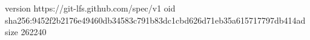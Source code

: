version https://git-lfs.github.com/spec/v1
oid sha256:9452f2b2176e49460db34583c791b83dc1cbd626d71eb35a615717797db414ad
size 262240
